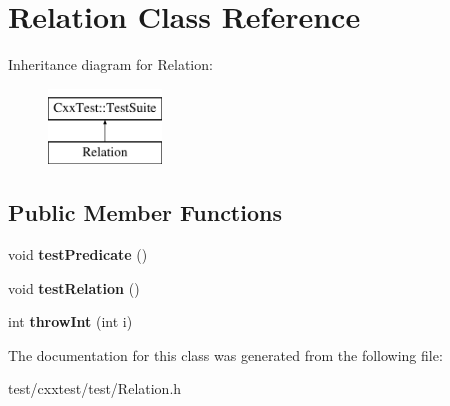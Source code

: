 \hypertarget{classRelation}{\section{Relation Class Reference}
\label{classRelation}
}
Inheritance diagram for Relation\-:\begin{figure}[H]
\begin{center}
\leavevmode
\includegraphics[height=2.000000cm]{classRelation}
\end{center}
\end{figure}
\subsection*{Public Member Functions}
\begin{DoxyCompactItemize}
\item 
\hypertarget{classRelation_aec24cb0db5261b86bfb7dff37dff1ccc}{void {\bfseries test\-Predicate} ()}\label{classRelation_aec24cb0db5261b86bfb7dff37dff1ccc}

\item 
\hypertarget{classRelation_a9d32916c53337642ef9ea5d4aa209c8f}{void {\bfseries test\-Relation} ()}\label{classRelation_a9d32916c53337642ef9ea5d4aa209c8f}

\item 
\hypertarget{classRelation_aad64c9a2d469625fef856640d9bad855}{int {\bfseries throw\-Int} (int i)}\label{classRelation_aad64c9a2d469625fef856640d9bad855}

\end{DoxyCompactItemize}


The documentation for this class was generated from the following file\-:\begin{DoxyCompactItemize}
\item 
test/cxxtest/test/Relation.\-h\end{DoxyCompactItemize}
